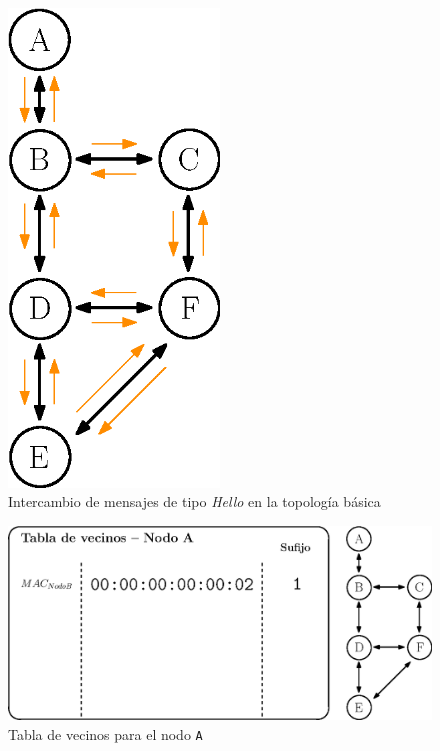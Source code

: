 \begin{figure}[ht]
    \centering
    \includegraphics[width=0.5\textwidth]{archivos/img/dev/topo_hellos.eps}
    \caption{Intercambio de mensajes de tipo \textit{Hello} en la topología básica}
    \label{fig:topo_hellos}
\end{figure}


\begin{figure}[ht!]
    \centering
    \includegraphics[width=\textwidth]{archivos/img/dev/topo_hello_nodoA_nb.eps}
    \caption{Tabla de vecinos para el nodo \texttt{A}}
    \label{fig:topo_hello_nodoA_nb}
\end{figure}

